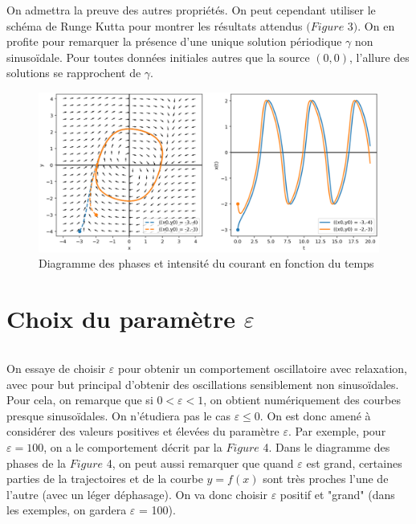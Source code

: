 \documentclass{article}
\begin{document}
On admettra la preuve des autres propriétés. On peut cependant utiliser le schéma de Runge Kutta pour montrer les résultats attendus $(Figure$ 3$)$.
On en profite pour remarquer la présence d'une unique solution périodique $\gamma$ non sinusoïdale.
Pour toutes données initiales autres que la source $(0,0)$, l'allure des solutions se rapprochent de $\gamma$.

\begin{figure}[!h]
\centering
\includegraphics[scale=0.4]{../images/dphase.png}
\caption{Diagramme des phases et intensité du courant en fonction du temps}
\end{figure}

\newpage
\section{Choix du paramètre $\varepsilon$}

\[\]

On essaye de choisir $\varepsilon$ pour obtenir un comportement oscillatoire avec relaxation, avec pour
but principal d’obtenir des oscillations sensiblement non sinusoïdales. Pour cela, on remarque
que si $0 <\varepsilon < 1$, on obtient numériquement des courbes presque sinusoïdales. On n'étudiera pas le cas
$\varepsilon \leq 0$.
On est donc amené à considérer des valeurs positives et élevées du paramètre $\varepsilon$. 
Par exemple, pour $\varepsilon = 100$, on a le comportement décrit par la $Figure$ 4.
Dans le diagramme des phases de la $Figure$ 4, on peut aussi remarquer que quand $\varepsilon$ est grand,
certaines parties de la trajectoires et de la courbe $y = f (x)$ sont très proches l’une de l’autre (avec un léger déphasage). On va donc choisir $\varepsilon$ positif et "grand" (dans les exemples, on gardera
$\varepsilon$ = 100).
\end{document}
